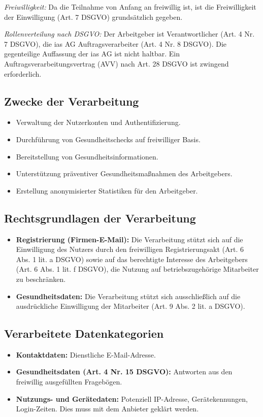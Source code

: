 \documentclass[12pt, a4paper]{article}
\begin{document}
\textit{Freiwilligkeit:} Da die Teilnahme von Anfang an freiwillig ist, ist die Freiwilligkeit der Einwilligung (Art. 7 DSGVO) grundsätzlich gegeben.

\textit{Rollenverteilung nach DSGVO:} Der Arbeitgeber ist Verantwortlicher (Art. 4 Nr. 7 DSGVO), die ias AG Auftragsverarbeiter (Art. 4 Nr. 8 DSGVO). Die gegenteilige Auffassung der ias AG ist nicht haltbar. Ein Auftragsverarbeitungsvertrag (AVV) nach Art. 28 DSGVO ist zwingend erforderlich.

\subsection{Zwecke der Verarbeitung}
\begin{itemize}
    \item Verwaltung der Nutzerkonten und Authentifizierung.
    \item Durchführung von Gesundheitschecks auf freiwilliger Basis.
    \item Bereitstellung von Gesundheitsinformationen.
    \item Unterstützung präventiver Gesundheitsmaßnahmen des Arbeitgebers.
    \item Erstellung anonymisierter Statistiken für den Arbeitgeber.
\end{itemize}

\subsection{Rechtsgrundlagen der Verarbeitung}
\begin{itemize}
    \item \textbf{Registrierung (Firmen-E-Mail):} Die Verarbeitung stützt sich auf die Einwilligung des Nutzers durch den freiwilligen Registrierungsakt (Art. 6 Abs. 1 lit. a DSGVO) sowie auf das berechtigte Interesse des Arbeitgebers (Art. 6 Abs. 1 lit. f DSGVO), die Nutzung auf betriebszugehörige Mitarbeiter zu beschränken.
    \item \textbf{Gesundheitsdaten:} Die Verarbeitung stützt sich ausschließlich auf die ausdrückliche Einwilligung der Mitarbeiter (Art. 9 Abs. 2 lit. a DSGVO).
\end{itemize}

\subsection{Verarbeitete Datenkategorien}
\begin{itemize}
    \item \textbf{Kontaktdaten:} Dienstliche E-Mail-Adresse.
    \item \textbf{Gesundheitsdaten (Art. 4 Nr. 15 DSGVO):} Antworten aus den freiwillig ausgefüllten Fragebögen.
    \item \textbf{Nutzungs- und Gerätedaten:} Potenziell IP-Adresse, Gerätekennungen, Login-Zeiten. Dies muss mit dem Anbieter geklärt werden.
\end{itemize}
\end{document}
